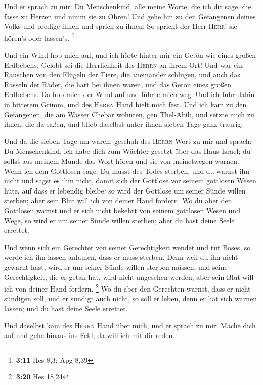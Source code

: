  Und er sprach zu mir: Du Menschenkind, alle meine Worte,
die ich dir sage, die fasse zu Herzen und nimm sie zu Ohren!
 Und gehe hin zu den Gefangenen deines Volks und predige
ihnen und sprich zu ihnen: So spricht der Herr \textsc{Herr}! sie
hören's oder lassen's. \footnote{\textbf{3:11} Hes 8,3; Apg 8,39}

 Und ein Wind hob mich auf, und ich hörte hinter mir ein
Getön wie eines großen Erdbebens: Gelobt sei die Herrlichkeit des
\textsc{Herrn} an ihrem Ort!  Und war ein Rauschen von
den Flügeln der Tiere, die aneinander schlugen, und auch das Rasseln der
Räder, die hart bei ihnen waren, und das Getön eines großen Erdbebens.
 Da hob mich der Wind auf und führte mich weg. Und ich
fuhr dahin in bitterem Grimm, und des \textsc{Herrn} Hand hielt mich
fest.  Und ich kam zu den Gefangenen, die am Wasser
Chebar wohnten, gen Thel-Abib, und setzte mich zu ihnen, die da saßen,
und blieb daselbst unter ihnen sieben Tage ganz traurig.

 Und da die sieben Tage um waren, geschah des
\textsc{Herrn} Wort zu mir und sprach:  Du Menschenkind,
ich habe dich zum Wächter gesetzt über das Haus Israel; du sollst aus
meinem Munde das Wort hören und sie von meinetwegen warnen.
 Wenn ich dem Gottlosen sage: Du musst des Todes sterben,
und du warnst ihn nicht und sagst es ihm nicht, damit sich der Gottlose
vor seinem gottlosen Wesen hüte, auf dass er lebendig bleibe: so wird
der Gottlose um seiner Sünde willen sterben; aber sein Blut will ich von
deiner Hand fordern.  Wo du aber den Gottlosen warnst und
er sich nicht bekehrt von seinem gottlosen Wesen und Wege, so wird er um
seiner Sünde willen sterben; aber du hast deine Seele errettet.

 Und wenn sich ein Gerechter von seiner Gerechtigkeit
wendet und tut Böses, so werde ich ihn lassen anlaufen, dass er muss
sterben. Denn weil du ihn nicht gewarnt hast, wird er um seiner Sünde
willen sterben müssen, und seine Gerechtigkeit, die er getan hat, wird
nicht angesehen werden; aber sein Blut will ich von deiner Hand fordern.
\footnote{\textbf{3:20} Hes 18,24}  Wo du aber den
Gerechten warnst, dass er nicht sündigen soll, und er sündigt auch
nicht, so soll er leben, denn er hat sich warnen lassen; und du hast
deine Seele errettet.

 Und daselbst kam des \textsc{Herrn} Hand über mich, und
er sprach zu mir: Mache dich auf und gehe hinaus ins Feld; da will ich
mit dir reden.


